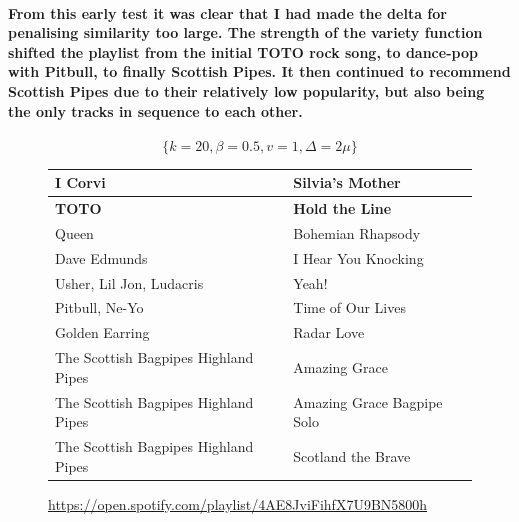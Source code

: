 \documentclass[a4paper, 12pt]{report}
\begin{document}
\paragraph{From this early test it was clear that I had made the delta for penalising similarity too large. The strength of the variety function shifted the playlist
from the initial TOTO rock song, to dance-pop with Pitbull, to finally Scottish Pipes. It then continued to recommend Scottish Pipes due to their relatively low popularity,
but also being the only tracks in sequence to each other.}
\[\{k = 20, \beta = 0.5, v = 1, \Delta = 2\mu\}\]
\begin{center}
    \begin{figure}[H]
        \begin{tabulary}{\linewidth}{|@{\makebox[2em][c]{\rownumber}}|L|L|} 
            \hline
            I Corvi & Silvia's Mother \\ 
            \hline
            \textbf{TOTO} & \textbf{Hold the Line} \\
            \hline
            Queen & Bohemian Rhapsody \\
            \hline
            Dave Edmunds & I Hear You Knocking \\
            \hline
            Usher, Lil Jon, Ludacris & Yeah! \\
            \hline
            Pitbull, Ne-Yo & Time of Our Lives \\
            \hline
            Golden Earring & Radar Love \\
            \hline
            The Scottish Bagpipes Highland Pipes & Amazing Grace \\
            \hline
            The Scottish Bagpipes Highland Pipes & Amazing Grace Bagpipe Solo \\
            \hline
            The Scottish Bagpipes Highland Pipes & Scotland the Brave \\
            \hline
        \end{tabulary}
    \caption{\url{https://open.spotify.com/playlist/4AE8JviFihfX7U9BN5800h}}
    \end{figure}
\end{center}
\end{document}
